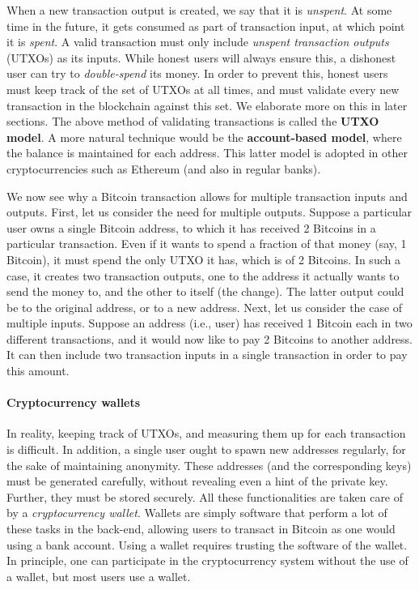 \documentclass{article}
\begin{document}
When a new transaction output is created, we say that it is \textit{unspent}. At some time in the future, it gets consumed as part of transaction input, at which point it is \textit{spent}. A valid transaction must only include \textit{unspent transaction outputs} (UTXOs) as its inputs. While honest users will always ensure this, a dishonest user can try to \textit{double-spend} its money. In order to prevent this, honest users must keep track of the set of UTXOs at all times, and must validate every new transaction in the blockchain against this set. We elaborate more on this in later sections. The above method of validating transactions is called the \textbf{UTXO model}. A more natural technique would be the \textbf{account-based model}, where the balance is maintained for each address. This latter model is adopted in other cryptocurrencies such as Ethereum (and also in regular banks).

We now see why a Bitcoin transaction allows for multiple transaction inputs and outputs. First, let us consider the need for multiple outputs. Suppose a particular user owns a single Bitcoin address, to which it has received 2 Bitcoins in a particular transaction. Even if it wants to spend a fraction of that money (say, 1 Bitcoin), it must spend the only UTXO it has, which is of 2 Bitcoins. In such a case, it creates two transaction outputs, one to the address it actually wants to send the money to, and the other to itself (the change). The latter output could be to the original address, or to a new address. Next, let us consider the case of multiple inputs. Suppose an address (i.e., user) has received 1 Bitcoin each in two different transactions, and it would now like to pay 2 Bitcoins to another address. It can then include two transaction inputs in a single transaction in order to pay this amount.

\paragraph{Cryptocurrency wallets} In reality, keeping track of UTXOs, and measuring them up for each transaction is difficult. In addition, a single user ought to spawn new addresses regularly, for the sake of maintaining anonymity. These addresses (and the corresponding keys) must be generated carefully, without revealing even a hint of the private key. Further, they must be stored securely. All these functionalities are taken care of by a \textit{cryptocurrency wallet}. Wallets are simply software that perform a lot of these tasks in the back-end, allowing users to transact in Bitcoin as one would using a bank account. Using a wallet requires trusting the software of the wallet. In principle, one can participate in the cryptocurrency system without the use of a wallet, but most users use a wallet.
\end{document}
